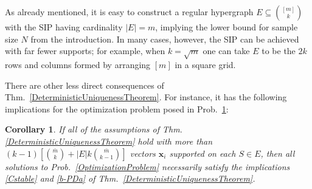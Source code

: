 \documentclass[9pt,twocolumn]{pnas-new}
\newtheorem{proposition}{Proposition}
\newtheorem{corollary}{Corollary}
\begin{document}
As already mentioned, it is easy to construct a regular hypergraph $E \subseteq {[m] \choose k}$ with the SIP having cardinality $|E| = m$, implying the lower bound for sample size $N$ from the introduction. In many cases, however, the SIP can be achieved with far fewer supports; for example, when $k = \sqrt{m}$ one can take $E$ to be the $2k$ rows and columns formed by arranging $[m]$ in a square grid.  

There are other less direct consequences of Thm.~\ref{DeterministicUniquenessTheorem}. For instance, it has the following implications for the optimization problem posed in Prob.~\ref{SLCopt}:

\begin{corollary}\label{SLCopt}
If all of the assumptions of Thm.\ref{DeterministicUniquenessTheorem} hold with more than $(k-1)\left[ {\bar m \choose k} + |E|k{\bar m \choose k-1}\right]$ vectors $\mathbf{x}_i$ supported on each $S \in E$, then all solutions to Prob.~\ref{OptimizationProblem} necessarily satisfy the implications \eqref{Cstable} and \eqref{b-PDa} of Thm.~\ref{DeterministicUniquenessTheorem}.
\end{corollary}
%
\end{document}
